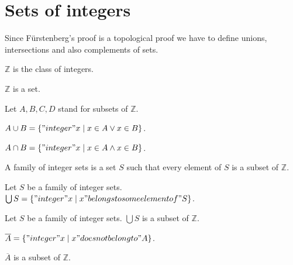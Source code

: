 \documentclass{article}
\newcommand{\Int}{\mathbb{Z}}
\begin{document}
  \section{Sets of integers}

  Since Fürstenberg's proof is a topological proof we have to define unions, intersections and also complements of sets.

  \begin{forthel}
    \begin{definition}
      $\Int$ is the class of integers.
    \end{definition}

    \begin{axiom}
      $\Int$ is a set.
    \end{axiom}

    Let $A,B,C,D$ stand for subsets of $\Int$.

    \begin{definition}[Union]
      $A \cup B = \{ "integer" x \mid x \in A \vee x \in B \}$.
    \end{definition}

    \begin{definition}[Intersection]
      $A \cap B = \{ "integer" x \mid x \in A \wedge x \in B \}$.
    \end{definition}

    \begin{definition}[IntegerSets]
      A family of integer sets is a set $S$ such that every element of $S$ is a subset of $\Int$.
    \end{definition}

    \begin{definition}[UnionSet]
      Let $S$ be a family of integer sets.
      $\bigcup S = \{ "integer" x \mid x "belongs to some element of" S \}$.
    \end{definition}

    \begin{lemma}
      Let $S$ be a family of integer sets. $\bigcup S$ is a subset of $\Int$.
    \end{lemma}

    \begin{definition}[Complement]
      $\overline{A} = \{ "integer" x \mid x "does not belong to" A \}$.
    \end{definition}

    \begin{lemma}
      $\overline{A}$ is a subset of $\Int$.
    \end{lemma}
   \end{forthel}
\end{document}
